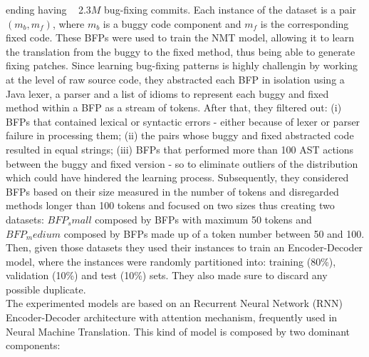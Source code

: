 ending having ~ 2.3\(M\) bug-fixing commits.
Each instance of the dataset is a pair $(m_b, m_f)$, where $m_b$ is a buggy code component and $m_f$ is the
corresponding fixed code. These BFPs were used to train the NMT model, allowing it to learn the translation
from the buggy to the fixed method, thus being able to generate fixing patches. Since learning bug-fixing
patterns is highly challengin by working at the level of raw source code, they abstracted 
each BFP in isolation using a Java lexer, a parser and a list of idioms to represent each buggy and fixed method 
within a BFP as a stream of tokens. After that, they filtered out: (i) BFPs that contained lexical or syntactic 
errors - either because of lexer or parser failure in processing them; (ii) the pairs whose buggy 
and fixed abstracted code resulted in equal strings; (iii) BFPs that performed more than 100 AST actions between the buggy 
and fixed version - so to eliminate outliers of the distribution which could have hindered
the learning process. Subsequently, they considered BFPs based on their size measured
in the number of tokens and disregarded methods longer than 100 tokens and focused on two sizes thus creating 
two datasets: \(BFP_small\) composed by BFPs with maximum 50 tokens and \(BFP_medium\)
composed by BFPs made up of a token number between 50 and 100.
Then, given those datasets they used their instances to train an Encoder-Decoder
model, where the instances were randomly partitioned into: training (80\%), validation (10\%) and 
test (10\%) sets. They also made sure to discard any possible duplicate.\\
\newline
The experimented models are based on an Recurrent Neural Network (RNN) Encoder-Decoder
architecture with attention mechanism, frequently used in Neural Machine Translation. 
This kind of model is composed by two
dominant components:

